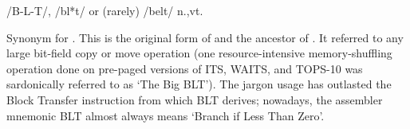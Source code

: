  /B-L-T/, /bl*t/ or (rarely) /belt/ n.,vt.

Synonym for . This is the original form of  and
the ancestor of . It referred to any large bit-field copy or
move operation (one resource-intensive memory-shuffling operation done on
pre-paged versions of ITS, WAITS, and TOPS-10 was sardonically referred to as
`The Big BLT'). The jargon usage has outlasted the 
Block
Transfer instruction from which BLT
derives; nowadays, the assembler mnemonic BLT
almost always means `Branch if Less Than Zero'.

